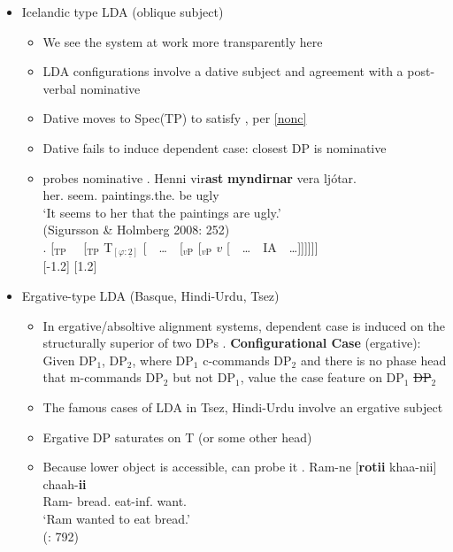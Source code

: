 \documentclass[letterpaper,10pt]{handout_nick}
\begin{document}
\begin{itemize}
\begin{itemize}
\end{itemize}
\item Icelandic type LDA (oblique subject)
\begin{itemize}
\item We see the system at work more transparently here
\item LDA configurations involve a dative subject and agreement with a post-verbal nominative
\item Dative moves to Spec(TP) to satisfy \fm{$\varphi$}, per \ref{nonc}
\item Dative fails to induce dependent case: closest DP is nominative
\item \fa{$\varphi$} probes nominative 
\exg. Henni vir\dh\textbf{ast} \textbf{myndirnar} vera lj\'otar.\\
her. seem. paintings.the. be ugly\\
`It seems to her that the paintings are ugly.'\\
(Sigur\dh sson \& Holmberg 2008: 252)\\

\ex. [$_\text{TP}$\ \ \hspace*{-.4cm} [$_\text{TP}$ \hspace*{-.2cm}T$_{[\varphi:\underline{2}]}$ [\ \ \ldots\ \ [$_\text{$v$P}$ \hspace*{-.3cm} [$_\text{$v$P}$ $v$ [\ \ \ldots\ \  \hspace*{-.3cm}IA\ \  \ldots]]]]]]\\
[-1.2]
[1.2]

\end{itemize}

\item Ergative-type LDA (Basque, Hindi-Urdu, Tsez)
\begin{itemize}
\item In ergative/absoltive alignment systems, dependent case is induced on the structurally superior of two DPs
\ex. \textbf{Configurational Case} (ergative):\\
Given DP$_1$, DP$_2$, where DP$_1$ c-commands DP$_2$ and there is no phase head that m-commands DP$_2$ but not DP$_1$, value the case feature on DP$_1$ \st{DP$_2$}

\item The famous cases of LDA in Tsez, Hindi-Urdu involve an ergative subject
\item Ergative DP saturates \fm{$\varphi$} on T (or some other head)
\item Because lower object is accessible, \fa{$\varphi$} can probe it
\exg. Ram-ne [{\bf rotii} khaa-nii] chaah-{\bf ii}\\
Ram- bread. eat-inf. want.\\
`Ram wanted to eat bread.'\\
(\citealt{bhatt05}: 792)


\end{itemize}
\end{itemize}
\end{document}
